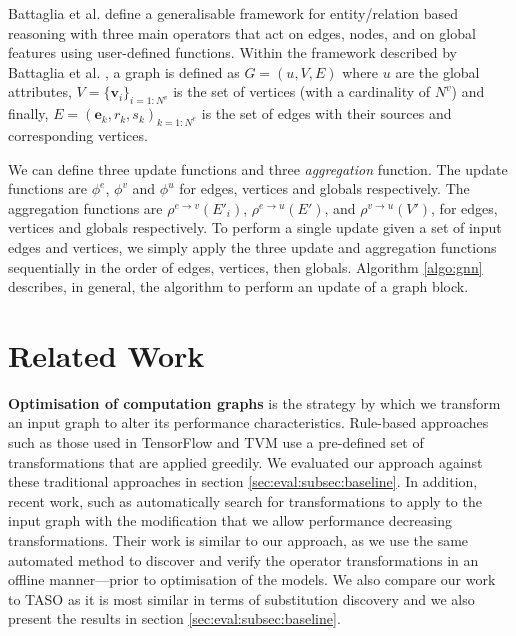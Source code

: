 Battaglia et al. \cite{battaglia2018relational} define a generalisable framework for entity/relation based reasoning with three main operators that act on edges, nodes, and on global features using user-defined functions. Within the framework described by Battaglia et al. \cite{battaglia2018relational}, a graph is defined as $G = (u, V, E)$ where $u$ are the global attributes, $V = \lbrace \mathbf{v}_i \rbrace_{i={1:N^v}}$ is the set of vertices (with a cardinality of $N^v$) and finally, $E = {(\mathbf{e}_k, r_k, s_k)}_{k={1:N^e}}$ is the set of edges with their sources and corresponding vertices.



We can define three update functions and three \textit{aggregation} function. The update functions are $\phi^e$, $\phi^v$ and $\phi^u$ for edges, vertices and globals respectively. The aggregation functions are $\rho^{e \rightarrow v} (E'_i)$, $\rho^{e \rightarrow u} (E')$, and $\rho^{v \rightarrow u} (V')$, for edges, vertices and globals respectively. To perform a single update given a set of input edges and vertices, we simply apply the three update and aggregation functions sequentially in the order of edges, vertices, then globals. Algorithm \ref{algo:gnn} describes, in general, the algorithm to perform an update of a graph block.



\section{Related Work}

\textbf{Optimisation of computation graphs} is the strategy by which we transform an input graph to alter its performance characteristics. Rule-based approaches such as those used in TensorFlow \cite{tensorflow2015-whitepaper} and TVM \cite{chen2018tvm} use a pre-defined set of transformations that are applied greedily. We evaluated our approach against these traditional approaches in section \ref{sec:eval:subsec:baseline}. In addition, recent work, such as \cite{jia2019optimizing,jia2019taso} automatically search for transformations to apply to the input graph with the modification that we allow performance decreasing transformations. Their work is similar to our approach, as we use the same automated method to discover and verify the operator transformations in an offline manner---prior to optimisation of the models. We also compare our work to TASO \cite{jia2019taso} as it is most similar in terms of substitution discovery and we also present the results in section \ref{sec:eval:subsec:baseline}.

